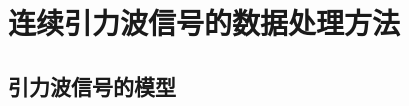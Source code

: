 \chapter{连续引力波信号的数据处理方法}
\label{chap:continuous gravitational wave data analysis methods}
\section{引力波信号的模型}
